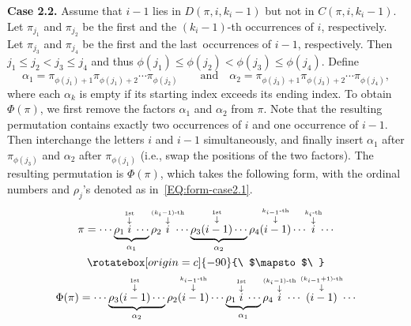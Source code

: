 \documentclass[11pt]{article}
\numberwithin{equation}{section}
\begin{document}
\noindent\textbf{Case 2.2.} Assume that $i-1$ lies in $D(\pi,i,k_i-1)$ but not in $C(\pi,i,k_i-1)$. Let $\pi_{j_1}$ and $\pi_{j_2}$ be the first and the $(k_i-1)$-th occurrences of $i$, respectively. Let $\pi_{j_3}$ and $\pi_{j_4}$ be the first and the last~occurrences of $i-1$, respectively. Then $j_1\le j_2<j_3\le j_4$ and thus $\phi(j_1)\le \phi(j_2)<\phi(j_3)\le \phi(j_4)$. Define
\[
\alpha_1=\pi_{\phi(j_1)+1}\pi_{\phi(j_1)+2}\cdots\pi_{\phi(j_2)}\qquad\text{and}\quad
\alpha_2=\pi_{\phi(j_3)+1}\pi_{\phi(j_3)+2}\cdots\pi_{\phi(j_4)},
\]
where each $\alpha_k$ is empty if its starting index exceeds its ending index. To obtain $\Phi(\pi)$, we first remove the factors $\alpha_1$ and $\alpha_2$ from $\pi$. Note that the resulting permutation contains exactly two occurrences of $i$ and one occurrence of $i-1$. Then interchange the letters $i$ and $i-1$ simultaneously, and finally insert $\alpha_1$ after $\pi_{\phi(j_3)}$ and $\alpha_2$ after $\pi_{\phi(j_1)}$ (i.e., swap the positions of the two factors). The resulting permutation is $\Phi(\pi)$, which takes the following form, with the ordinal numbers and $\rho_j$'s denoted as in~\eqref{EQ:form-case2.1}.
\begin{gather}
\pi=\cdots \underbrace{\rho_1
	\overset{\overset{\text{1st}}{\downarrow}}{i}
	\cdots}_{\alpha_1}
\rho_2
\mkern-17mu \overset{\overset{(k_i-1)\text{-th}}{\downarrow}}{i}\mkern-17mu
\cdots
\underbrace{\rho_3
	\overset{\overset{\text{1st}}{\downarrow}}{(i-1)}
	\cdots}_{\alpha_2}
\rho_4
\overset{\overset{k_{i-1}\text{-th}}{\downarrow}}{(i-1)}
\cdots
\mkern-5mu
\overset{\overset{k_i\text{-th}}{\downarrow}}{i}
\mkern-5mu
\cdots\nonumber\\
%
\rotatebox[origin=c]{-90}{\ $\mapsto$\ }\nonumber\\
%
\Phi(\pi)=\cdots \underbrace{\rho_3
	\overset{\overset{\text{1st}}{\downarrow}}{(i-1)}
	\cdots}_{\alpha_2}
\rho_2
\overset{\overset{k_{i-1}\text{-th}}{\downarrow}}{(i-1)}
\cdots
\underbrace{\rho_1
	\overset{\overset{\text{1st}}{\downarrow}}{i}
	\cdots}_{\alpha_1}
\rho_4
\mkern-17mu
\overset{\overset{(k_{i}-1)\text{-th}}{\downarrow}}{i}
\mkern-17mu
\cdots
\mkern-3mu
\overset{\overset{(k_{i-1}+1)\text{-th}}{\downarrow}}{(i-1)}
\mkern-3mu
\cdots\label{EQ:form-case2.2}
\end{gather}
\end{document}
